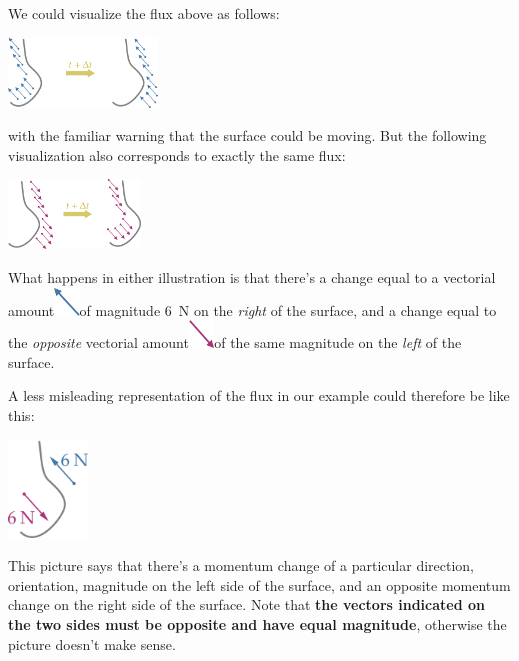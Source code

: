 \documentclass[a4paper,12pt,%
onecolumn,oneside,titlepage,%
british%
]{memoir}
\renewcommand*{\|}[1][]{\nonscript\:#1\vert\nonscript\:\mathopen{}}
\begin{document}
We could visualize the flux above as follows:
\begin{center}
  \includegraphics[height=5em]{flux_vector_shift.pdf}
\end{center}
with the familiar warning that the surface could be moving. But the following visualization also corresponds to exactly the same flux:
\begin{center}
  \includegraphics[height=5em]{flux_vector_shift_neg.pdf}
\end{center}
What happens in either illustration is that there's a change equal to a vectorial amount\enspace\includegraphics[align=c,height=2em]{vec_NW.pdf}\enspace of magnitude \qty{6}{N} on the \emph{right} of the surface, and a change equal to the \emph{opposite} vectorial amount\enspace\includegraphics[align=c,height=2em]{vec_SE.pdf}\enspace of the same magnitude on the \emph{left} of the surface.

{A less misleading representation of the flux in our example could therefore be like this:\noprelistbreak%
  \begin{center}
    \includegraphics[height=7em]{flux_vec_both.pdf}
  \end{center}
}
\noindent This picture says that there's a momentum change of a particular direction, orientation, magnitude on the left side of the surface, and an opposite momentum change on the right side of the surface. Note that \textbf{the vectors indicated on the two sides must be opposite and have equal magnitude}, otherwise the picture doesn't make sense.
\end{document}

